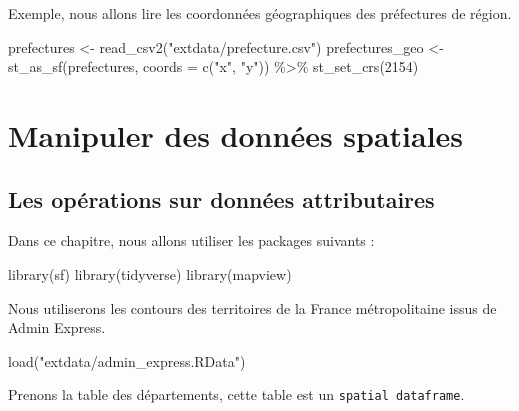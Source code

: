 \documentclass[
]{book}
\newenvironment{Shaded}{\begin{snugshade}}{\end{snugshade}}
\newcommand{\AttributeTok}[1]{\textcolor[rgb]{0.77,0.63,0.00}{#1}}
\newcommand{\DecValTok}[1]{\textcolor[rgb]{0.00,0.00,0.81}{#1}}
\newcommand{\FunctionTok}[1]{\textcolor[rgb]{0.00,0.00,0.00}{#1}}
\newcommand{\NormalTok}[1]{#1}
\newcommand{\OtherTok}[1]{\textcolor[rgb]{0.56,0.35,0.01}{#1}}
\newcommand{\SpecialCharTok}[1]{\textcolor[rgb]{0.00,0.00,0.00}{#1}}
\newcommand{\StringTok}[1]{\textcolor[rgb]{0.31,0.60,0.02}{#1}}
\begin{document}
Exemple, nous allons lire les coordonnées géographiques des préfectures de région.

\begin{Shaded}
\begin{Highlighting}[]
\NormalTok{prefectures }\OtherTok{\textless{}{-}} \FunctionTok{read\_csv2}\NormalTok{(}\StringTok{"extdata/prefecture.csv"}\NormalTok{)}
\NormalTok{prefectures\_geo }\OtherTok{\textless{}{-}} \FunctionTok{st\_as\_sf}\NormalTok{(prefectures, }\AttributeTok{coords =} \FunctionTok{c}\NormalTok{(}\StringTok{"x"}\NormalTok{, }\StringTok{"y"}\NormalTok{)) }\SpecialCharTok{\%\textgreater{}\%}
  \FunctionTok{st\_set\_crs}\NormalTok{(}\DecValTok{2154}\NormalTok{)}
\end{Highlighting}
\end{Shaded}

\hypertarget{part-manipuler-des-donnuxe9es-spatiales}{%
\part{Manipuler des données spatiales}\label{part-manipuler-des-donnuxe9es-spatiales}}

\hypertarget{les-opuxe9rations-sur-donnuxe9es-attributaires}{%
\chapter{Les opérations sur données attributaires}\label{les-opuxe9rations-sur-donnuxe9es-attributaires}}

Dans ce chapitre, nous allons utiliser les packages suivants :

\begin{Shaded}
\begin{Highlighting}[]
\FunctionTok{library}\NormalTok{(sf)}
\FunctionTok{library}\NormalTok{(tidyverse)}
\FunctionTok{library}\NormalTok{(mapview)}
\end{Highlighting}
\end{Shaded}

Nous utiliserons les contours des territoires de la France métropolitaine issus de Admin Express.

\begin{Shaded}
\begin{Highlighting}[]
\FunctionTok{load}\NormalTok{(}\StringTok{"extdata/admin\_express.RData"}\NormalTok{)}
\end{Highlighting}
\end{Shaded}

Prenons la table des départements, cette table est un \texttt{spatial\ dataframe}.
\end{document}

